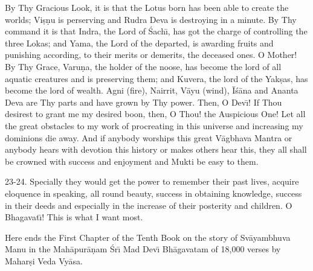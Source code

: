 By Thy Gracious Look, it is that the Lotus born has been able to create the worlds; Vi\d{s}\d{n}u is perserving and Rudra Deva is destroying in a minute. By Thy command it is that Indra, the Lord of \'Sach\={\i}, has got the charge of controlling the three Lokas; and Yama, the Lord of the departed, is awarding fruits and punishing according, to their merits or demerits, the deceased ones. O Mother! By Thy Grace, Varu\d{n}a, the holder of the noose, has become the lord of all aquatic creatures and is preserving them; and Kuvera, the lord of the Yak\d{s}as, has become the lord of wealth. Agni (fire), Nairrit, V\=ayu (wind), \=I\'s\=ana and Ananta Deva are Thy parts and have grown by Thy power. Then, O Dev\={\i}! If Thou desirest to grant me my desired boon, then, O Thou! the Auspicious One! Let all the great obstacles to my work of procreating in this universe and increasing my dominions die away. And if anybody worships this great V\=agbhava Mantra or anybody hears with devotion this history or makes others hear this, they all shall be crowned with success and enjoyment and Mukti be easy to them.

23-24. Specially they would get the power to remember their past lives, acquire eloquence in speaking, all round beauty, success in obtaining knowledge, success in their deeds and especially in the increase of their posterity and children. O Bhagavat\={\i}! This is what I want most.

Here ends the First Chapter of the Tenth Book on the story of Sv\=ayambhuva Manu in the Mah\=apur\=a\d{n}am \'Sr\={\i} Mad Dev\={\i} Bh\=agavatam of 18,000 verses by Mahar\d{s}i Veda Vy\=asa.



